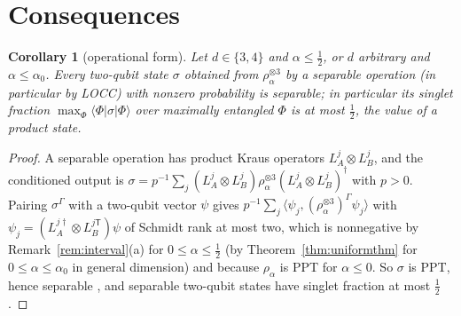 \documentclass[aps,pra,twocolumn,superscriptaddress,nofootinbib,longbibliography]{revtex4-2}
\newcommand{\ket}[1]{|#1\rangle}
\newcommand{\bra}[1]{\langle #1|}
\newcommand{\T}{\mathsf T}
\theoremstyle{plain}
\newtheorem{corollary}[theorem]{Corollary}
\theoremstyle{definition}
\theoremstyle{remark}
\begin{document}
\section{Consequences}\label{sec:consequences}

\begin{corollary}[operational form]\label{cor:locc}
Let $d\in\{3,4\}$ and $\alpha\le\tfrac12$, or $d$ arbitrary and $\alpha\le\alpha_0$. Every two-qubit state $\sigma$ obtained from $\rho_\alpha^{\otimes3}$ by a separable operation (in particular by LOCC) with nonzero probability is separable; in particular its singlet fraction $\max_\Phi\bra\Phi\sigma\ket\Phi$ over maximally entangled $\Phi$ is at most $\tfrac12$, the value of a product state.
\end{corollary}
\begin{proof}
A separable operation has product Kraus operators $L^j_A\otimes L^j_B$, and the conditioned output is $\sigma=p^{-1}\sum_j(L^j_A\otimes L^j_B)\rho_\alpha^{\otimes3}(L^j_A\otimes L^j_B)^\dagger$ with $p>0$. Pairing $\sigma^\Gamma$ with a two-qubit vector $\psi$ gives $p^{-1}\sum_j\langle\psi_j,(\rho_\alpha^{\otimes3})^\Gamma\psi_j\rangle$ with $\psi_j=(L^{j\dagger}_A\otimes L^{j\T}_B)\psi$ of Schmidt rank at most two, which is nonnegative by Remark~\ref{rem:interval}(a) for $0\le\alpha\le\tfrac12$ (by Theorem~\ref{thm:uniformthm} for $0\le\alpha\le\alpha_0$ in general dimension) and because $\rho_\alpha$ is PPT for $\alpha\le0$. So $\sigma$ is PPT, hence separable \cite{Peres,HHH96}, and separable two-qubit states have singlet fraction at most $\tfrac12$ \cite{HHHfid}.
\end{proof}
\end{document}
